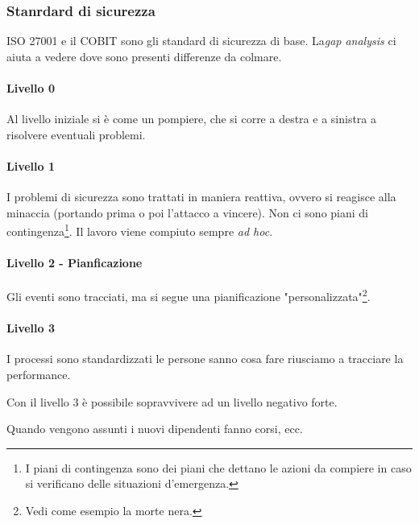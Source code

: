 \subsubsection{Stanrdard di sicurezza}

ISO 27001 e il COBIT sono gli standard di sicurezza di base. La\textit{gap 
analysis} ci aiuta a vedere dove sono presenti differenze da colmare.


\paragraph{Livello 0}


Al livello iniziale si è come un pompiere, che si corre a destra e a sinistra a 
risolvere eventuali problemi.

\paragraph{Livello 1}

I problemi di sicurezza sono trattati in maniera reattiva, ovvero si reagisce 
alla minaccia (portando prima o poi l'attacco a vincere). Non ci sono piani di 
contingenza\footnote{I piani di contingenza sono dei piani che dettano le azioni 
da compiere in caso si verificano delle situazioni d'emergenza.}. Il lavoro 
viene compiuto sempre \textit{ad hoc}.

\paragraph{Livello 2 - Pianficazione}

Gli eventi sono tracciati, ma si segue una pianificazione 
"personalizzata"\footnote{Vedi come esempio la morte nera.}.

\paragraph{Livello 3}
I processi sono standardizzati le persone sanno cosa fare riusciamo a tracciare 
la performance. 



Con il livello 3 è possibile sopravvivere ad un livello negativo forte.






Quando vengono assunti i nuovi dipendenti fanno corsi, ecc.









